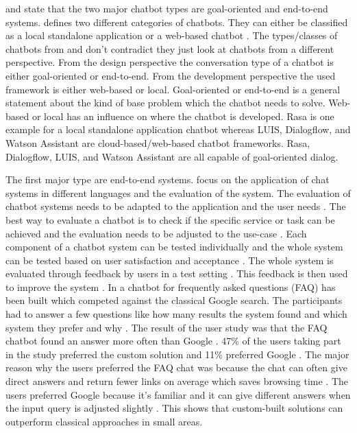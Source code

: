 \citet{williams2017hybrid} and \citet{bordes2016learning} state that the two major chatbot types are goal-oriented and end-to-end systems.
\citet{kane2016role} defines two different categories of chatbots.
They can either be classified as a local standalone application or a web-based chatbot \cite{kane2016role}.
The types/classes of chatbots from \citet{williams2017hybrid, bordes2016learning} and \citet{kane2016role} 
don't contradict they just look at chatbots from a different perspective.
From the design perspective the conversation type of a chatbot is either goal-oriented or end-to-end.
From the development perspective the used framework is either web-based or local.
Goal-oriented or end-to-end is a general statement about the kind of base problem 
which the chatbot needs to solve.
Web-based or local has an influence on where the chatbot is developed.
Rasa is one example for a local standalone application chatbot whereas LUIS, 
Dialogflow, and Watson Assistant are cloud-based/web-based chatbot frameworks.
Rasa, Dialogflow, LUIS, and Watson Assistant are all capable of goal-oriented dialog.

The first major type are end-to-end systems.
\citet{evaluateChatbotsShawar2007} focus on the application of chat systems in different languages and the evaluation of the system.
The evaluation of chatbot systems needs to be adapted to the application and the user needs \cite{evaluateChatbotsShawar2007}.
The best way to evaluate a chatbot is to check if the specific service or task can be achieved and the evaluation 
needs to be adjusted to the use-case \cite{evaluateChatbotsShawar2007}.
Each component of a chatbot system can be tested individually and the whole system can be tested based on user 
satisfaction and acceptance \cite{evaluateChatbotsShawar2007}.
The whole system is evaluated through feedback by users in a test setting \cite{evaluateChatbotsShawar2007}.
This feedback is then used to improve the system \cite{evaluateChatbotsShawar2007}. 
In \citet{evaluateChatbotsShawar2007} a chatbot for frequently asked questions (FAQ) has been built 
which competed against the classical Google search.
The participants had to answer a few questions like how many results the system found and which system they prefer 
and why \cite{evaluateChatbotsShawar2007}. 
The result of the user study was that the FAQ chatbot found an answer more often than Google \cite{evaluateChatbotsShawar2007}.
47\% of the users taking part in the study preferred the custom solution and 11\% preferred Google \cite{evaluateChatbotsShawar2007}.
The major reason why the users preferred the FAQ chat was because the chat can often give direct answers and return 
fewer links on average which saves browsing time \cite{evaluateChatbotsShawar2007}. 
The users preferred Google because it's familiar and it can give different answers when the input query is adjusted 
slightly \cite{evaluateChatbotsShawar2007}.
This shows that custom-built solutions can outperform classical approaches in small areas.

